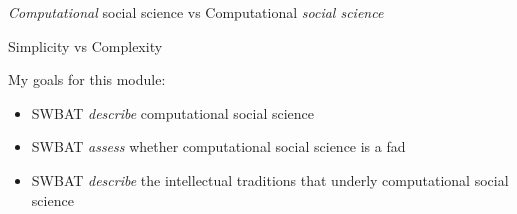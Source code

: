 \documentclass{beamer}
\begin{document}
\begin{frame}

\emph{Computational} social science vs Computational \emph{social science}

\end{frame}
\begin{frame}

\begin{center}
\Large{Simplicity vs Complexity}
\end{center}

\end{frame}
\begin{frame}

My goals for this module:
\begin{itemize}
\item SWBAT \emph{describe} computational social science
\item SWBAT \emph{assess} whether computational social science is a fad
\item SWBAT \emph{describe} the intellectual traditions that underly computational social science
\end{itemize}

\end{frame}
\end{document}
